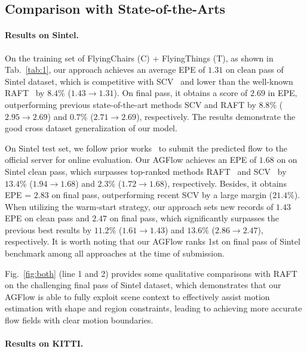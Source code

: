 \documentclass[letterpaper]{article} %
\begin{document}
\subsection{Comparison with State-of-the-Arts}

\paragraph{Results on Sintel.}

On the training set of FlyingChairs (C) + FlyingThings (T), as shown in Tab.~\ref{tab:1}, our approach achieves an average EPE of $1.31$ on clean pass of Sintel dataset, which is competitive with SCV~\cite{Jiang2021LearningOF} and lower than the well-known RAFT~\cite{Teed2020RAFTRA} by $8.4\%$ ($1.43 \rightarrow 1.31$). On final pass, it obtains a score of $2.69$ in EPE, outperforming previous state-of-the-art methods SCV and RAFT by $8.8\%$ ($2.95 \rightarrow 2.69$) and $0.7\%$ ($2.71 \rightarrow 2.69$), respectively. The results demonstrate the good cross dataset generalization of our model.

On Sintel test set, we follow prior works~\cite{Hui2018LiteFlowNetAL, Hur2019IterativeRR, Teed2020RAFTRA} to submit the predicted flow to the official server for online evaluation. Our AGFlow achieves an EPE of $1.68$ on on Sintel clean pass, which surpasses top-ranked methods RAFT~\cite{Teed2020RAFTRA} and SCV~\cite{Jiang2021LearningOF} by $13.4\%$ ($1.94 \rightarrow 1.68$) and $2.3\%$ ($1.72 \rightarrow 1.68$), respectively. Besides, it obtains EPE = $2.83$ on final pass, outperforming recent SCV by a large margin ($21.4\%$). When utilizing the warm-start strategy, our approach sets new records of $1.43$ EPE on clean pass and $2.47$ on final pass, which significantly surpasses the previous best results by $11.2\%$ ($1.61 \rightarrow 1.43$) and $13.6\%$ ($2.86 \rightarrow 2.47$), respectively. It is worth noting that our AGFlow ranks 1st on final pass of Sintel benchmark among all approaches at the time of submission.

Fig.~\ref{fig:both} (line 1 and 2) provides some qualitative comparisons with RAFT~\cite{Teed2020RAFTRA} on the challenging final pass of Sintel dataset, which demonstrates that our AGFlow is able to fully exploit scene context to effectively assist motion estimation with shape and region constraints, leading to achieving more accurate flow fields with clear motion boundaries.

\paragraph{Results on KITTI.}
\end{document}
